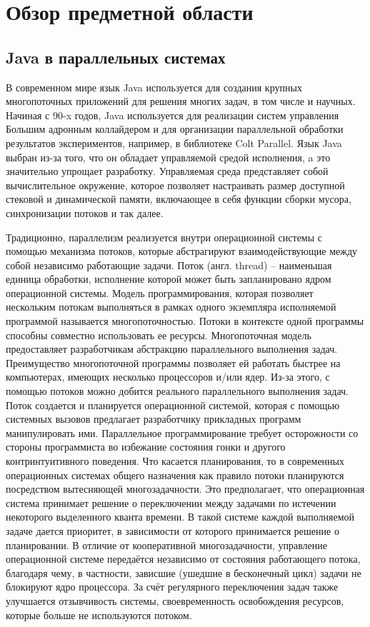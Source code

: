 \section{Обзор предметной области}
	\subsection{Java в параллельных системах}
	В современном мире язык Java используется для создания крупных многопоточных приложений 
	для решения многих задач, в том числе и научных. Начиная с 90-x годов, Java используется для реализации
	систем управления Большим адронным коллайдером и для организации параллельной обработки результатов 
	экспериментов, например, в библиотеке Colt Parallel\cite{colt}. Язык Java выбран из-за того, что он 
	обладает управляемой средой исполнения, a это значительно упрощает разработку. Управляемая среда представляет
	собой вычислительное окружение, которое позволяет настраивать размер доступной стековой и динамической памяти,
	включающее в себя функции сборки мусора,
	синхронизации потоков и так далее.
	\par
	Традиционно, параллелизм реализуется внутри операционной системы с помощью механизма потоков, 
	которые абстрагируют взаимодействующие между собой независимо работающие задачи. 
	Поток (англ. thread) -- наименьшая единица обработки, исполнение которой может 
	быть запланировано ядром операционной системы\cite{thread}. 
	Модель программирования, которая позволяет нескольким потокам выполняться в рамках одного экземпляра
	исполняемой программой называется многопоточностью. Потоки в контексте одной программы способны
	совместно использовать ее ресурсы. Многопоточная модель предоставляет
	разработчикам абстракцию параллельного выполнения задач. Преимущество многопоточной программы 
	позволяет ей работать быстрее на компьютерах, имеющих несколько процессоров и/или ядер. Из-за этого, с
	помощью потоков можно добится реального параллельного выполнения задач. Поток создается и планируется
	операционной системой, которая с помощью системных вызовов предлагает разработчику прикладных программ
	манипулировать ими. Параллельное программирование требует осторожности со стороны программиста во
	избежание состояния гонки и другого контринтуитивного поведения. 
	Что касается планирования, то в современных операционных системах общего назначения как правило потоки
	планируются посредством вытесняющей многозадачности. Это предполагает, что операционная система принимает
	решение о переключении между задачами по истечении некоторого выделенного кванта времени.
	В такой системе каждой выполняемой задаче дается приоритет, в зависимости от которого принимается решение
	о планировании. В отличие от кооперативной многозадачности, управление операционной системе передаётся
	независимо от состояния работающего потока, благодаря чему, в частности, зависшие (ушедшие в бесконечный цикл)
	задачи не блокируют ядро процессора. За счёт регулярного переключения задач 
	также улучшается отзывчивость системы, своевременность освобождения ресурсов, которые больше
	не используются потоком.
	

